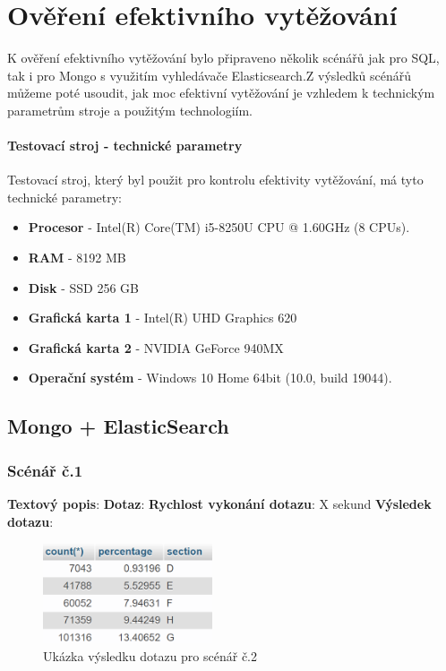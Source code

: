 \lstset{style=sqlstyle}

\chapter{Ověření efektivního vytěžování}
K ověření efektivního vytěžování bylo připraveno několik scénářů jak pro SQL, tak i pro Mongo s využitím vyhledávače Elasticsearch.Z výsledků scénářů můžeme poté usoudit, jak moc efektivní vytěžování je vzhledem k technickým parametrům stroje a použitým technologiím.

\subsubsection{Testovací stroj - technické parametry}
Testovací stroj, který byl použit pro kontrolu efektivity vytěžování, má tyto technické parametry:
\begin{itemize}
\item \textbf{Procesor} - Intel(R) Core(TM) i5-8250U CPU @ 1.60GHz (8 CPUs).
\item \textbf{RAM} - 8192 MB
\item \textbf{Disk} - SSD 256 GB
\item \textbf{Grafická karta 1} - Intel(R) UHD Graphics 620
\item \textbf{Grafická karta 2} - NVIDIA GeForce 940MX
\item \textbf{Operační systém} - Windows 10 Home 64bit (10.0, build 19044).

\end{itemize}

\section{Mongo + ElasticSearch}

\subsection{Scénář č.1}
\textbf{Textový popis}: 
\newline
\textbf{Dotaz}: 
\newline
\textbf{Rychlost vykonání dotazu}: \textpm X sekund
\newline
\textbf{Výsledek dotazu}:
\begin{figure}[H]
\centering
\includegraphics[width=5cm]{img/scenare/scenar_2}
\caption{Ukázka výsledku dotazu pro scénář č.2}
\label{fig:scenar2}
\end{figure}

